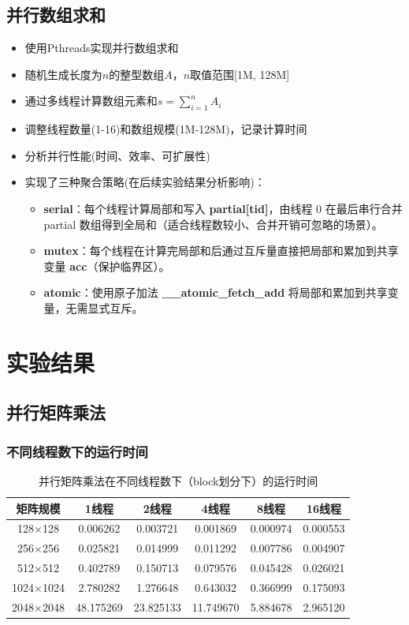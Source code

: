\documentclass{SYSUReport}
\begin{document}
\subsection{并行数组求和}
\begin{itemize}
    \item 使用Pthreads实现并行数组求和
    \item 随机生成长度为$n$的整型数组$A$，$n$取值范围[1M, 128M]
    \item 通过多线程计算数组元素和$s = \sum_{i=1}^{n}A_i$
    \item 调整线程数量(1-16)和数组规模(1M-128M)，记录计算时间
    \item 分析并行性能(时间、效率、可扩展性)
    \item 实现了三种聚合策略(在后续实验结果分析影响)：
    \begin{itemize}
        \item \textbf{serial}：每个线程计算局部和写入 \textbf{partial[tid]}，由线程 0 在最后串行合并 partial 数组得到全局和（适合线程数较小、合并开销可忽略的场景）。
        \item \textbf{mutex}：每个线程在计算完局部和后通过互斥量直接把局部和累加到共享变量 \textbf{acc}（保护临界区）。
        \item \textbf{atomic}：使用原子加法 \textbf{\_\_atomic\_fetch\_add} 将局部和累加到共享变量，无需显式互斥。
    \end{itemize}
\end{itemize}


\section{实验结果}

\subsection{并行矩阵乘法}

\subsubsection{不同线程数下的运行时间}
\begin{table}[H]
\centering
\caption{并行矩阵乘法在不同线程数下（block划分下）的运行时间}
\begin{tabular}{cccccc}
\toprule
矩阵规模 & 1线程 & 2线程 & 4线程 & 8线程 & 16线程 \\
\midrule
128×128 & 0.006262 & 0.003721 & 0.001869 & 0.000974 & 0.000553 \\
256×256 & 0.025821 & 0.014999 & 0.011292 & 0.007786 & 0.004907 \\
512×512 & 0.402789 & 0.150713 & 0.079576 & 0.045428 & 0.026021 \\
1024×1024 & 2.780282 & 1.276648 & 0.643032 & 0.366999 & 0.175093 \\
2048×2048 & 48.175269 & 23.825133 & 11.749670 & 5.884678 & 2.965120 \\
\bottomrule
\end{tabular}
\end{table}
\end{document}
